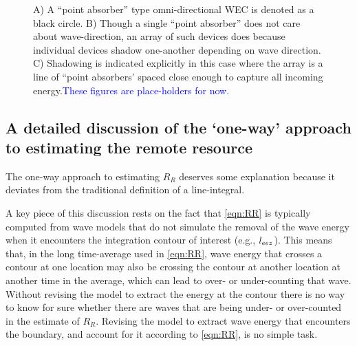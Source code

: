 \begin{figure}[ht]
    \centering
    \caption{A) A ``point absorber'' type omni-directional WEC is denoted as a black circle. B) Though a single ``point absorber'' does not care about wave-direction, an array of such devices does because individual devices shadow one-another depending on wave direction. C) Shadowing is indicated explicitly in this case where the array is a line of ``point absorbers' spaced close enough to capture all incoming energy.\textcolor{blue}{These figures are place-holders for now. }}
    \label{fig:omni-dir}
\end{figure}

\subsection{A detailed discussion of the `one-way' approach to estimating the remote resource}

The one-way approach to estimating $R_R$ deserves some explanation because it deviates from the traditional definition of a line-integral.

A key piece of this discussion rests on the fact that \eqref{eqn:RR} is typically computed from wave models that do not simulate the removal of the wave energy when it encounters the integration contour of interest (e.g., $l_{eez}$). This means that, in the long time-average used in \eqref{eqn:RR}, wave energy that crosses a contour at one location may also be crossing the contour at another location at another time in the average, which can lead to over- or under-counting that wave. Without revising the model to extract the energy at the contour there is no way to know for sure whether there are waves that are being under- or over-counted in the estimate of $R_R$. Revising the model to extract wave energy that encounters the boundary, and account for it according to \eqref{eqn:RR}, is no simple task.

